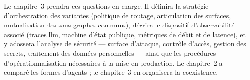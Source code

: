 Le chapitre~3 prendra ces questions en charge. Il définira la
stratégie d'orchestration des variantes (politique de routage,
articulation des surfaces, mutualisation des sous-graphes communs),
décrira le dispositif d'observabilité associé (traces \gls{llm},
machine d'état publique, métriques de débit et de latence), et y
adossera l'analyse de sécurité — surface d'attaque, contrôle
d'accès, gestion des secrets, traitement des données personnelles —
ainsi que les procédures d'opérationnalisation nécessaires à la
mise en production. Le chapitre~2 a comparé les formes d'agents ; le
chapitre~3 en organisera la coexistence.

\newpage
